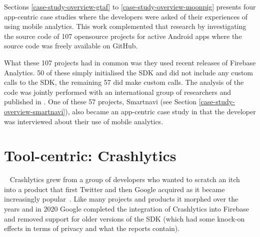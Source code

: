 Sections \ref{case-study-overview-gtaf} to \ref{case-study-overview-moonpig} presents four app-centric case studies where the developers were asked of their experiences of using mobile analytics. This work complemented that research by investigating the source code of 107 opensource projects for active Android apps where the source code was freely available on GitHub. 

What these 107 projects had in common was they used recent releases of Firebase Analytics. 50 of these simply initialised the SDK and did not include any custom calls to the SDK, the remaining 57 did make custom calls. The analysis of the code was jointly performed with an international group of researchers and published in . One of these 57 projects, Smartnavi (see Section \ref{case-study-overview-smartnavi}), also became an app-centric case study in that the developer was interviewed about their use of mobile analytics. 


\clearpage

\section{Tool-centric: Crashlytics}~\label{case-study-overview-crashlytics}
Crashlytics grew from a group of developers who wanted to scratch an itch~ into a product that first Twitter and then Google acquired as it became increasingly popular~. 
Like many projects and products it morphed over the years and in 2020 Google completed the integration of Crashlytics into Firebase and removed support for older versions of the SDK (which had some knock-on effects in terms of privacy and what the reports contain).

